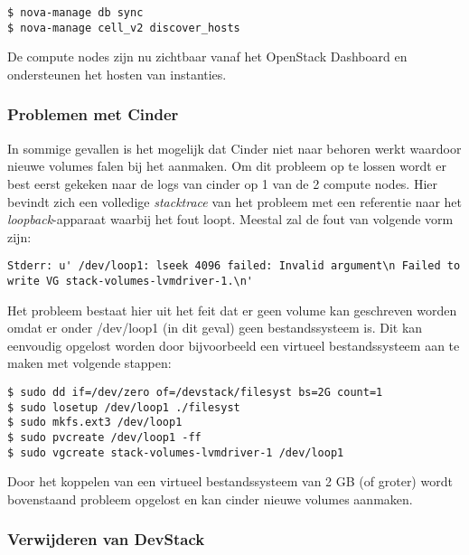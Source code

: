 \begin{appendices}
\begin{code}
\begin{verbatim}
$ nova-manage db sync
$ nova-manage cell_v2 discover_hosts
\end{verbatim}
\end{code}

De compute nodes zijn nu zichtbaar vanaf het OpenStack Dashboard en ondersteunen het hosten van instanties.

\subsubsection{Problemen met Cinder}

In sommige gevallen is het mogelijk dat Cinder niet naar behoren werkt waardoor nieuwe volumes falen bij het aanmaken. Om dit probleem op te lossen wordt er best eerst gekeken naar de logs van cinder op 1 van de 2 compute nodes. Hier bevindt zich een volledige \textit{stacktrace} van het probleem met een referentie naar het \textit{loopback}-apparaat waarbij het fout loopt. Meestal zal de fout van volgende vorm zijn:

\begin{code}
\begin{verbatim}
Stderr: u' /dev/loop1: lseek 4096 failed: Invalid argument\n Failed to
write VG stack-volumes-lvmdriver-1.\n'
\end{verbatim}
\end{code}

Het probleem bestaat hier uit het feit dat er geen volume kan geschreven worden omdat er onder /dev/loop1 (in dit geval) geen bestandssysteem is. Dit kan eenvoudig opgelost worden door bijvoorbeeld een virtueel bestandssysteem aan te maken met volgende stappen:

\begin{code}
\begin{verbatim}
$ sudo dd if=/dev/zero of=/devstack/filesyst bs=2G count=1
$ sudo losetup /dev/loop1 ./filesyst
$ sudo mkfs.ext3 /dev/loop1
$ sudo pvcreate /dev/loop1 -ff
$ sudo vgcreate stack-volumes-lvmdriver-1 /dev/loop1
\end{verbatim}
\end{code}

Door het koppelen van een virtueel bestandssysteem van 2 GB (of groter) wordt bovenstaand probleem opgelost en kan cinder nieuwe volumes aanmaken.
 
\subsubsection{Verwijderen van DevStack}
 

\end{appendices}
